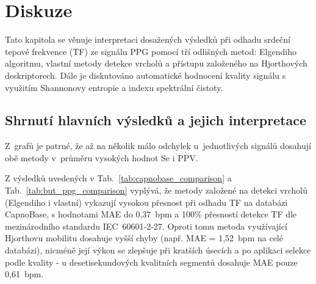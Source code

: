 \chapter{Diskuze} %
\label{ch:diskuze}

Tato kapitola se věnuje interpretaci dosažených výsledků při odhadu srdeční tepové frekvence (\acs{TF}) ze signálu \acs{PPG} pomocí tří odlišných metod: Elgendiho algoritmu, vlastní metody detekce vrcholů a přístupu založeného na Hjorthových deskriptorech.
Dále je diskutováno automatické hodnocení kvality signálu s využitím Shannonovy entropie a indexu spektrální čistoty.

\section{Shrnutí hlavních výsledků a jejich interpretace}

Z~grafů je patrné, že až na několik málo odchylek u~jednotlivých signálů dosahují obě metody v~průměru vysokých hodnot \acs{Se} i \acs{PPV}. %

Z výsledků uvedených v Tab.~\ref{tab:capnobase_comparison} a Tab.~\ref{tab:but_ppg_comparison} vyplývá, že metody založené na detekci vrcholů (Elgendiho i vlastní) vykazují vysokou přesnost při odhadu TF na databázi CapnoBase, s hodnotami MAE do 0{,}37~\acs{bpm} a 100\% přesností detekce TF dle mezinárodního standardu IEC~60601-2-27. %
Oproti tomu metoda využívající Hjorthovu mobilitu dosahuje vyšší chyby (např. MAE = 1{,}52~\acs{bpm} na celé databázi), nicméně její výkon se zlepšuje při kratších úsecích a po aplikaci selekce podle kvality - u desetisekundových kvalitních segmentů dosahuje MAE pouze 0{,}61~\acs{bpm}. %

